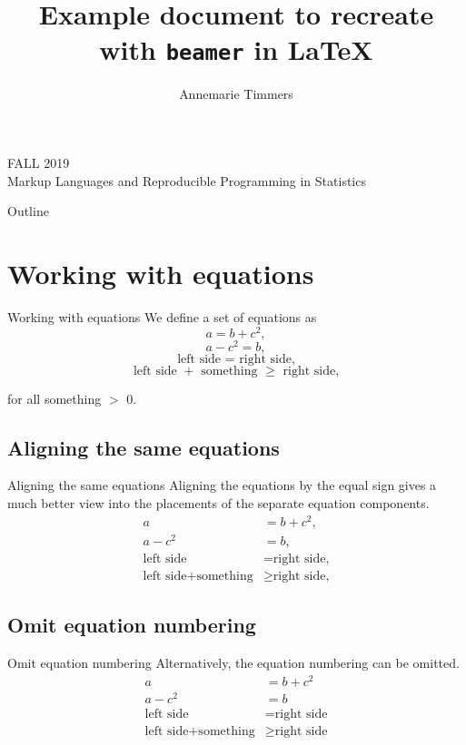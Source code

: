 \documentclass[aspectratio=169]{beamer}
\title{Example document to recreate with \texttt{beamer} in \LaTeX{}}
\author{Annemarie Timmers}
\date{}
\begin{document}
\begin{frame}[plain]
  \titlepage
  \vfill
  \begin{center}
  FALL 2019 \\
  Markup Languages and Reproducible Programming in Statistics
  \end{center}
\end{frame}

\begin{frame}{Outline}
  \tableofcontents
\end{frame}

\section{Working with equations}
\begin{frame}{Working with equations}
  We define a set of equations as 
  \begin{equation}
     a = b + c^2,
  \end{equation}
  \begin{equation}
     a - c^2 = b,
  \end{equation}
  \begin{equation}
     \text{left side = right side,}
  \end{equation}
  \begin{equation}
     \text{left side $+$ something $\geq$ right side,}
  \end{equation}
  
  for all something $>$ 0. 
\end{frame}

\subsection{Aligning the same equations}
\begin{frame}{Aligning the same equations}
  Aligning the equations by the equal sign gives a much better view into the placements
  of the separate equation components.
  \begin{align}
     a &= b + c^2, \\
     a - c^2 &= b,\\
     \text{left side} &= \text{right side,} \\
     \text{left side} + \text{something} &\geq \text{right side,}
  \end{align}

\end{frame}

\subsection{Omit equation numbering}
\begin{frame} {Omit equation numbering}
  Alternatively, the equation numbering can be omitted.
  \begin{align*}
     a &= b + c^2 \\
     a - c^2 &= b\\
     \text{left side} &= \text{right side} \\
     \text{left side} + \text{something} &\geq \text{right side}
  \end{align*}
\end{frame}
\end{document}
